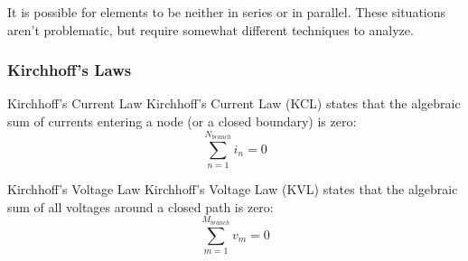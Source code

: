 \documentclass[12pt]{article}
\begin{document}
It is possible for elements to be neither in series or in parallel. These situations aren't problematic, but require somewhat different techniques to analyze.

\subsubsection{Kirchhoff's Laws}
\label{sssec:kirchoffsLaws}

\begin{definition}{Kirchhoff's Current Law}
  Kirchhoff's Current Law (KCL) states that the algebraic sum of currents entering a node (or a closed boundary) is zero:
  \begin{equation*}
    \sum_{n=1}^{N_{branch}} i_n = 0
  \end{equation*}
\end{definition}

\begin{definition}{Kirchhoff's Voltage Law}
  Kirchhoff's Voltage Law (KVL) states that the algebraic sum of all voltages around a closed path is zero:
  \begin{equation*}
    \sum_{m=1}^{M_{branch}} v_m = 0
  \end{equation*}
\end{definition}
\end{document}
